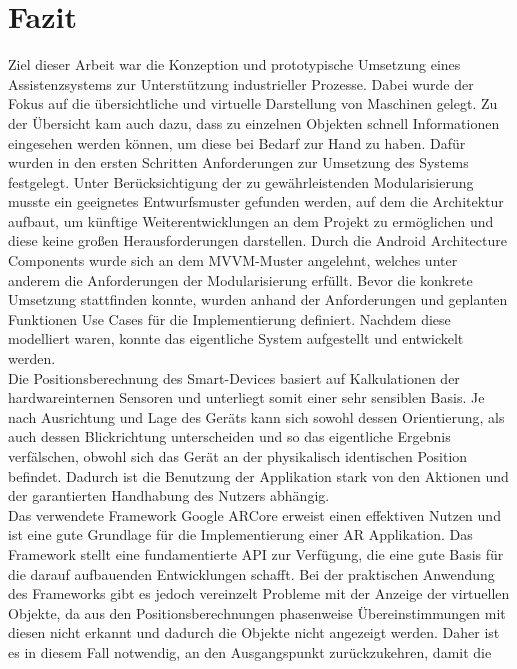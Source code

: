 \chapter{Fazit}
\label{chap:Fazit}
Ziel dieser Arbeit war die Konzeption und prototypische Umsetzung eines Assistenzsystems zur Unterstützung industrieller Prozesse. Dabei wurde der Fokus auf die 
übersichtliche und virtuelle Darstellung von Maschinen gelegt. Zu der Übersicht kam auch dazu, dass zu einzelnen Objekten schnell Informationen eingesehen 
werden können, um diese bei Bedarf zur Hand zu haben. Dafür wurden in den ersten Schritten Anforderungen zur Umsetzung des Systems festgelegt. Unter Berücksichtigung der 
zu gewährleistenden Modularisierung musste ein geeignetes Entwurfsmuster gefunden werden, auf dem die Architektur aufbaut, um künftige Weiterentwicklungen an dem Projekt 
zu ermöglichen und diese keine großen Herausforderungen darstellen. Durch die Android Architecture Components wurde sich an dem MVVM-Muster angelehnt, welches unter anderem 
die Anforderungen der Modularisierung erfüllt. Bevor die konkrete Umsetzung stattfinden konnte, wurden anhand der Anforderungen und geplanten Funktionen Use Cases für die 
Implementierung definiert. Nachdem diese modelliert waren, konnte das eigentliche System aufgestellt und entwickelt werden.
\\ 
\linebreak
Die Positionsberechnung des Smart-Devices basiert auf Kalkulationen der hardwareinternen Sensoren und unterliegt somit einer sehr sensiblen Basis. Je nach Ausrichtung und 
Lage des Geräts kann sich sowohl dessen Orientierung, als auch dessen Blickrichtung unterscheiden und so das eigentliche Ergebnis verfälschen, obwohl sich das Gerät an der physikalisch 
identischen Position befindet. Dadurch ist die Benutzung der Applikation stark von den Aktionen und der garantierten Handhabung des Nutzers abhängig. 
\\ 
\linebreak
Das verwendete Framework Google ARCore erweist einen effektiven Nutzen und ist eine gute Grundlage für die Implementierung einer \acl{AR} Applikation. Das 
Framework stellt eine fundamentierte \acs{API} zur Verfügung, die eine gute Basis für die darauf aufbauenden Entwicklungen schafft. Bei der praktischen 
Anwendung des Frameworks gibt es jedoch vereinzelt Probleme mit der Anzeige der virtuellen Objekte, da aus den Positionsberechnungen phasenweise Übereinstimmungen mit diesen 
nicht erkannt und dadurch die Objekte nicht angezeigt werden. Daher ist es in diesem Fall notwendig, an den Ausgangspunkt zurückzukehren, damit die 
